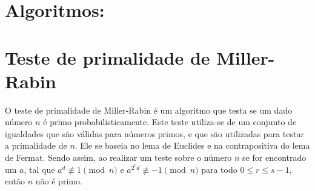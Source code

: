\documentclass[
    article,            %
    11pt,               %
    oneside,            %
    a4paper,            %
    english,            %
    brazil,             %
    sumario=tradicional,
    ]{abntex2}
\begin{document}

\frenchspacing 


%
%

\maketitle


\textual


\section*{\textbf{Algoritmos:}}

\setcounter{section}{0}
\section{\textbf{Teste de primalidade de Miller-Rabin}}
\label{miller-rabin}

O teste de primalidade de Miller-Rabin é um algoritmo que testa se um dado número $n$ é primo probabilisticamente. Este teste utiliza-se de um conjunto de igualdades que são válidas para números primos, e que são utilizadas para testar a primalidade de $n$. Ele se baseia no lema de Euclides e na contrapositiva do lema de Fermat. Sendo assim, ao realizar um teste sobre o número $n$ se for encontrado um $a$, tal que $a^d \not\equiv 1 \pmod n$ e $a^{2^rd} \not\equiv -1 \pmod n$ para todo $0 \leq r \leq s-1$, então $n$ não é primo.
\end{document}
